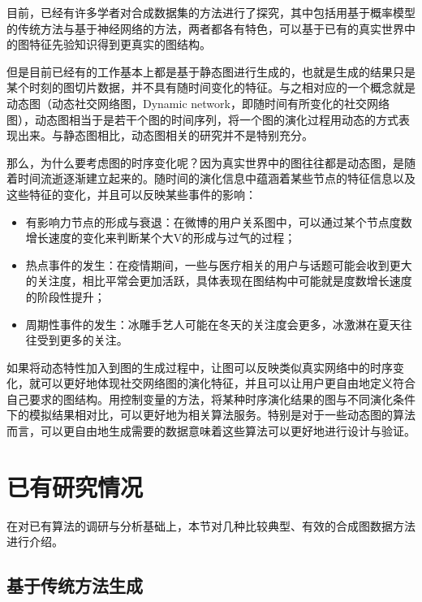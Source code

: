 目前，已经有许多学者对合成数据集的方法进行了探究，其中包括用基于概率模型的传统方法与基于神经网络的方法，两者都各有特色，可以基于已有的真实世界中的图特征先验知识得到更真实的图结构。

但是目前已经有的工作基本上都是基于静态图进行生成的，也就是生成的结果只是某个时刻的图切片数据，并不具有随时间变化的特征。与之相对应的一个概念就是动态图（动态社交网络图，Dynamic network，即随时间有所变化的社交网络图\cite{sarkar2006dynamic}），动态图相当于是若干个图的时间序列，将一个图的演化过程用动态的方式表现出来。与静态图相比，动态图相关的研究并不是特别充分。

那么，为什么要考虑图的时序变化呢？因为真实世界中的图往往都是动态图，是随着时间流逝逐渐建立起来的。随时间的演化信息中蕴涵着某些节点的特征信息以及这些特征的变化，并且可以反映某些事件的影响：

\begin{itemize}
  \item 有影响力节点的形成与衰退\cite{braha2006centrality}：在微博的用户关系图中，可以通过某个节点度数增长速度的变化来判断某个大V的形成与过气的过程；
  \item 热点事件的发生：在疫情期间，一些与医疗相关的用户与话题可能会收到更大的关注度，相比平常会更加活跃，具体表现在图结构中可能就是度数增长速度的阶段性提升；
  \item 周期性事件的发生：冰雕手艺人可能在冬天的关注度会更多，冰激淋在夏天往往受到更多的关注。
\end{itemize}

\vspace{0.2cm}

如果将动态特性加入到图的生成过程中，让图可以反映类似真实网络中的时序变化，就可以更好地体现社交网络图的演化特征，并且可以让用户更自由地定义符合自己要求的图结构。用控制变量的方法，将某种时序演化结果的图与不同演化条件下的模拟结果相对比，可以更好地为相关算法服务。特别是对于一些动态图的算法而言，可以更自由地生成需要的数据意味着这些算法可以更好地进行设计与验证。

\section{已有研究情况}

在对已有算法的调研与分析基础上，本节对几种比较典型、有效的合成图数据方法进行介绍。

\subsection{基于传统方法生成}

